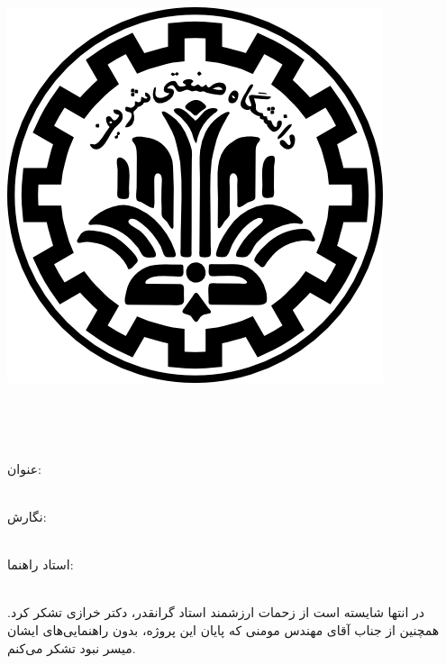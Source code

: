
\pagestyle{empty}

\begin{center}

\includegraphics[scale=0.2]{front/template/images/logo.png}

\begin{Large}

\vspace{-0.2cm}
\ThesisUniversity \\[-0.3em]
\ThesisDepartment

\vspace{0.5cm}

\ThesisType \\[-0.3em]
\ThesisMajor

\end{Large}

\vspace{1cm}

\large{عنوان:}\\[-.5em]
\huge{\textbf{\ThesisTitle}}\\

\vspace{1cm}

\large{نگارش:}\\
\Large{\textbf{\ThesisAuthor}}\\

\vspace{0.7cm}

\large{استاد راهنما:}\\ 
\Large{\textbf{\ThesisSupervisor}}\\

\vspace{0.8cm}

\large{\ThesisDate}


\end{center}

\vspace{0.5cm}
\begin{flushright}
در انتها شایسته است از زحمات ارزشمند استاد گرانقدر، دکتر خرازی تشکر کرد. همچنین از جناب آقای مهندس مومنی که پایان این پروژه، بدون راهنمایی‌های ایشان میسر نبود تشکر می‌کنم.
\end{flushright}


\newpage
